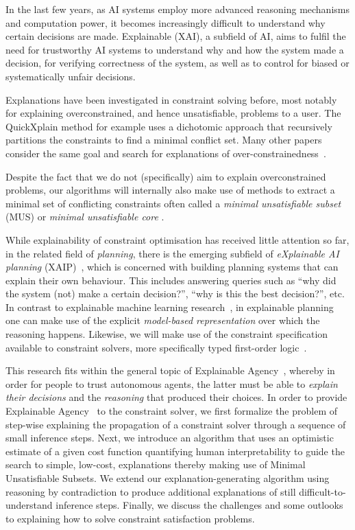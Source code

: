In the last few years, as AI systems employ more advanced reasoning mechanisms and computation power, it becomes increasingly difficult to understand why certain decisions are made.
Explainable (XAI), a subfield of AI, aims to fulfil the need for trustworthy AI systems to understand why and how the system made a decision, for verifying correctness of the system, as well as to control for biased or systematically unfair decisions.

Explanations have been investigated in constraint solving before, most notably for explaining overconstrained, and hence unsatisfiable, problems to a user.
The QuickXplain method \cite{junker2001quickxplain} for example uses a dichotomic approach that recursively partitions the constraints to find a minimal conflict set. Many other papers consider the same goal and search for explanations of over-constrainedness~\cite{leo2017debugging,zeighami2018towards}.

Despite the fact that we do not (specifically) aim to explain overconstrained problems, our algorithms will internally also make use of methods to extract a minimal set of conflicting constraints often called a \emph{minimal unsatisfiable subset} (MUS) or \emph{minimal unsatisfiable core} \cite{marques2010minimal}.

While explainability of constraint optimisation has received little attention so far, in the related field of \textit{planning}, there is the emerging subfield of \textit{eXplainable AI planning} (XAIP)~\cite{fox2017explainable}, which is concerned with building planning systems that can explain their own behaviour.
This includes answering queries such as ``why did the system (not) make a certain decision?'', ``why is this the best decision?'', etc. In contrast to explainable machine learning research~\cite{guidotti2018survey}, in explainable planning one can make use of the explicit \textit{model-based representation} over which the reasoning happens. 
Likewise, we will make use of the constraint specification available to constraint solvers, more specifically typed first-order logic~\cite{atcl/Wittocx13}.

This research fits within the general topic of Explainable Agency~\cite{langley2017explainable}, whereby in order for people to trust autonomous agents, the latter must be able to \textit{explain their decisions} and the \textit{reasoning} that produced their choices.
In order to provide Explainable Agency~\cite{langley2017explainable} to the constraint solver, we first formalize the problem of step-wise explaining the propagation of a constraint solver through a sequence of small inference steps.
Next, we introduce an algorithm that uses an optimistic estimate of a given cost function quantifying human interpretability to guide the search to simple, low-cost, explanations thereby making use of Minimal Unsatisfiable Subsets.
We extend our explanation-generating algorithm using reasoning by contradiction to produce additional explanations of still difficult-to-understand inference steps.
Finally, we discuss the challenges and some outlooks to explaining how to solve constraint satisfaction problems.

